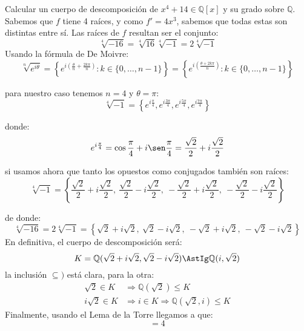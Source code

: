 \begin{ejercicio}
    Calcular un cuerpo de descomposición de $x^4+14\in \mathbb{Q}[x]$ y su grado sobre $\mathbb{Q}$.\\

    \noindent
    Sabemos que $f$ tiene 4 raíces, y como $f'=4x^3$, sabemos que todas estas son distintas entre sí. Las raíces de $f$ resultan ser el conjunto:
    \begin{equation*}
        \sqrt[4]{-16} = \sqrt[4]{16}\sqrt[4]{-1} = 2\sqrt[4]{-1}
    \end{equation*}
    Usando la fórmula de De Moivre:
    \begin{equation*}
        \sqrt[n]{e^{i\theta}} = \left\{e^{i\left(\frac{\theta}{n}+\frac{2k\pi}{n}\right)}: k \in \{0,\ldots,n-1\}\right\} = \left\{e^{i\left(\frac{\theta+2k\pi}{n}\right)}:k \in \{0,\ldots,n-1\}\right\}
    \end{equation*}

    para nuestro caso tenemos $n=4$ y $\theta = \pi$:
    \begin{equation*}
        \sqrt[4]{-1} = \left\{e^{i\frac{\pi}{4}}, e^{i\frac{3\pi}{4}}, e^{i\frac{5\pi}{4}}, e^{i\frac{7\pi}{4}}\right\}
    \end{equation*}

    donde:
    \begin{equation*}
        e^{i\frac{\pi}{4}} = \cos\frac{\pi}{4} + i\sen\frac{\pi}{4} = \frac{\sqrt{2}}{2} + i\frac{\sqrt{2}}{2}
    \end{equation*}

    si usamos ahora que tanto los opuestos como conjugados también son raíces:
    \begin{equation*}
        \sqrt[4]{-1} = \left\{\frac{\sqrt{2}}{2} + i\frac{\sqrt{2}}{2},~\frac{\sqrt{2}}{2} - i\frac{\sqrt{2}}{2},~-\frac{\sqrt{2}}{2} + i\frac{\sqrt{2}}{2},~-\frac{\sqrt{2}}{2} - i\frac{\sqrt{2}}{2}\right\}
    \end{equation*}

    de donde:
    \begin{equation*}
        \sqrt[4]{-16} = 2\sqrt[4]{-1} = \left\{\sqrt{2} + i\sqrt{2},~\sqrt{2} - i\sqrt{2},~-\sqrt{2} + i\sqrt{2},~-\sqrt{2} - i\sqrt{2}\right\}
    \end{equation*}
    En definitiva, el cuerpo de descomposición será:
    \begin{equation*}
        K = \mathbb{Q}(\sqrt{2}+i\sqrt{2}, \sqrt{2}-i\sqrt{2}) \AstIg \mathbb{Q}(i,\sqrt{2})
    \end{equation*}
    la inclusión $\subseteq )$ está clara, para la otra:
    \begin{align*}
        \sqrt{2}\in K &\Longrightarrow \mathbb{Q}(\sqrt{2}) \leq K \\
        i\sqrt{2}\in K &\Longrightarrow i \in K \Longrightarrow \mathbb{Q}(\sqrt{2},i) \leq K
    \end{align*}
    Finalmente, usando el Lema de la Torre llegamos a que:
    \begin{equation*}
        [K:\mathbb{Q}] = 4
    \end{equation*}
\end{ejercicio}

